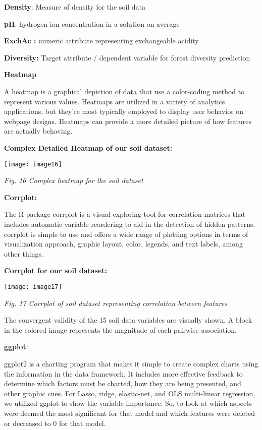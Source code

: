 \documentclass{article} %
\begin{document}
\noindent \textbf{Density}: Measure of density for the soil data

\noindent \textbf{pH}: hydrogen ion concentration in a solution on average

\noindent \textbf{ExchAc : }numeric\textbf{ }attribute representing exchangeable acidity 

\noindent \textbf{Diversity: }Target attribute / dependent variable for forest diversity prediction

\noindent \textbf{}

\noindent \textbf{Heatmap}

\noindent A heatmap is a graphical depiction of data that use a color-coding method to represent various values. Heatmaps are utilized in a variety of analytics applications, but they're most typically employed to display user behavior on webpage designs. Heatmaps can provide a more detailed picture of how features are actually behaving.

\noindent \textbf{Complex Detailed Heatmap of our soil dataset:}

\noindent 

\noindent \texttt{[image: image16]}

\noindent \textit{Fig. 16 Complex heatmap for the soil dataset}

\noindent \textbf{Corrplot:}

\noindent The R package corrplot is a visual exploring tool for correlation matrices that includes automatic variable reordering to aid in the detection of hidden patterns. corrplot is simple to use and offers a wide range of plotting options in terms of visualization approach, graphic layout, color, legends, and text labels, among other things. 

\noindent \textbf{Corrplot for our soil dataset:}

\noindent \texttt{[image: image17]}

\noindent \textit{Fig. 17 Corrplot of soil dataset representing correlation between features}

\noindent 

\noindent The convergent validity of the 15 soil data variables are visually shown. A block in the colored image represents the magnitude of each pairwise association.

\noindent \textbf{ggplot}:

\noindent ggplot2 is a charting program that makes it simple to create complex charts using the information in the data framework. It includes more effective feedback to determine which factors must be charted, how they are being presented, and other graphic cues. For Lasso, ridge, elastic-net, and OLS multi-linear regression, we utilized ggplot to show the variable importance. So, to look at which aspects were deemed the most significant for that model and which features were deleted or decreased to 0 for that model.
\end{document}
